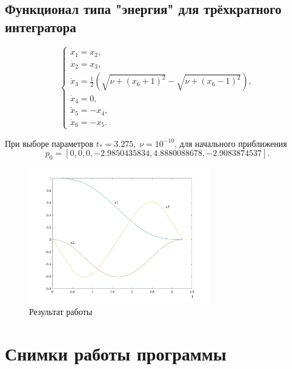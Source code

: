 \documentclass[oneside,final,12pt]{extreport}
\begin{document}
\section*{Функционал типа "энергия" для трёхкратного интегратора}

$$
\begin{cases}
\dot{x}_1=x_2,
\\
\dot{x}_2=x_3,
\\
\dot{x}_3=\frac{1}{2}(\sqrt{\nu + (x_6+1)^2}-\sqrt{\nu + (x_6-1)^2}), 
\\
\dot{x}_4=0,
\\
\dot{x}_5=-x_4,
\\
\dot{x}_6=-x_5.
\end{cases}	
$$

\noindent При выборе параметров $t_* = 3.275, \; \nu = 10^{-10}$, для начального приближения 
$$
p_0 = [0, 0, 0, -2.9850435834, 4.8880088678, -2.9083874537].
$$


\begin{figure}[H]
	\centering
	\includegraphics[width=0.7\textwidth]{10}
	\caption{Результат работы}
	\label{gr1}
\end{figure}

\chapter*{Снимки работы программы}
\end{document}
